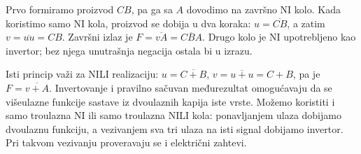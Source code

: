 
Prvo formiramo proizvod \(CB\), pa ga sa \(A\) dovodimo na završno NI kolo. Kada koristimo samo NI kola, proizvod se dobija u dva koraka: \(u=\overline{CB}\), a zatim \(v=\overline{uu}=CB\). Završni izlaz je \(F=\overline{vA}=\overline{CBA}\). Drugo kolo je NI upotrebljeno kao invertor; bez njega unutrašnja negacija ostala bi u izrazu.

Isti princip važi za NILI realizaciju: \(u=\overline{C+B}\), \(v=\overline{u+u}=C+B\), pa je \(F=\overline{v+A}\). Invertovanje i pravilno sačuvan međurezultat omogućavaju da se višeulazne funkcije sastave iz dvoulaznih kapija iste vrste. Možemo koristiti i samo troulazna NI ili samo troulazna NILI kola: ponavljanjem ulaza dobijamo dvoulaznu funkciju, a vezivanjem sva tri ulaza na isti signal dobijamo invertor. Pri takvom vezivanju proveravaju se i električni zahtevi.

